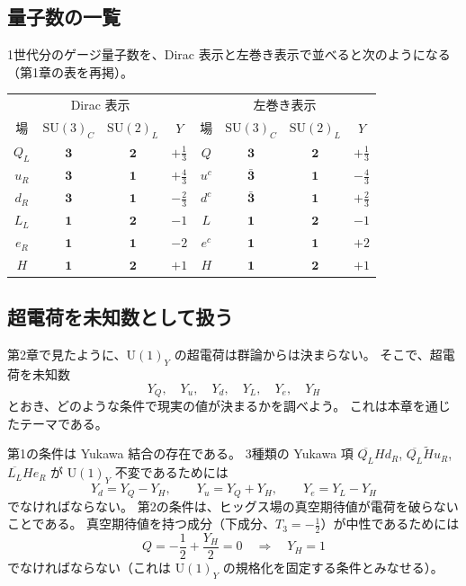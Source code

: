 \documentclass[uplatex,dvipdfmx,a4paper,11pt,openany]{jsbook}
\numberwithin{equation}{chapter}
\theoremstyle{definition}
\theoremstyle{plain}
\theoremstyle{remark}
\newcommand{\SU}{\mathrm{SU}}
\newcommand{\U}{\mathrm{U}}
\begin{document}
\subsection{量子数の一覧}
1世代分のゲージ量子数を、Dirac 表示と左巻き表示で並べると次のようになる
（第1章の表を再掲）。
\begin{center}
\renewcommand{\arraystretch}{1.3}
\begin{tabular}{cccc|cccc}
\toprule
\multicolumn{4}{c|}{Dirac 表示} & \multicolumn{4}{c}{左巻き表示}\\
場 & $\SU(3)_C$ & $\SU(2)_L$ & $Y$ & 場 & $\SU(3)_C$ & $\SU(2)_L$ & $Y$\\
\midrule
$Q_L$ & $\mathbf3$ & $\mathbf2$ & $+\frac13$ & $Q$ & $\mathbf3$ & $\mathbf2$ & $+\frac13$\\
$u_R$ & $\mathbf3$ & $\mathbf1$ & $+\frac43$ & $u^c$ & $\bar{\mathbf3}$ & $\mathbf1$ & $-\frac43$\\
$d_R$ & $\mathbf3$ & $\mathbf1$ & $-\frac23$ & $d^c$ & $\bar{\mathbf3}$ & $\mathbf1$ & $+\frac23$\\
$L_L$ & $\mathbf1$ & $\mathbf2$ & $-1$ & $L$ & $\mathbf1$ & $\mathbf2$ & $-1$\\
$e_R$ & $\mathbf1$ & $\mathbf1$ & $-2$ & $e^c$ & $\mathbf1$ & $\mathbf1$ & $+2$\\
\midrule
$H$ & $\mathbf1$ & $\mathbf2$ & $+1$ & $H$ & $\mathbf1$ & $\mathbf2$ & $+1$\\
\bottomrule
\end{tabular}
\end{center}
\subsection{超電荷を未知数として扱う}
第2章で見たように、$\U(1)_Y$ の超電荷は群論からは決まらない。
そこで、超電荷を未知数
\begin{equation}
Y_Q,\quad Y_u,\quad Y_d,\quad Y_L,\quad Y_e,\quad Y_H
\end{equation}
とおき、どのような条件で現実の値が決まるかを調べよう。
これは本章を通じたテーマである。

第1の条件は Yukawa 結合の存在である。
3種類の Yukawa 項 $\overline{Q_L}Hd_R$, $\overline{Q_L}\tilde Hu_R$, $\overline{L_L}He_R$ が
$\U(1)_Y$ 不変であるためには
\begin{equation}
Y_d=Y_Q-Y_H,\qquad
Y_u=Y_Q+Y_H,\qquad
Y_e=Y_L-Y_H
\label{eq:Y-yukawa}
\end{equation}
でなければならない。
第2の条件は、ヒッグス場の真空期待値が電荷を破らないことである。
真空期待値を持つ成分（下成分、$T_3=-\frac12$）が中性であるためには
\begin{equation}
Q=-\frac12+\frac{Y_H}{2}=0
\quad\Longrightarrow\quad
Y_H=1
\label{eq:YH}
\end{equation}
でなければならない（これは $\U(1)_Y$ の規格化を固定する条件とみなせる）。
\end{document}
